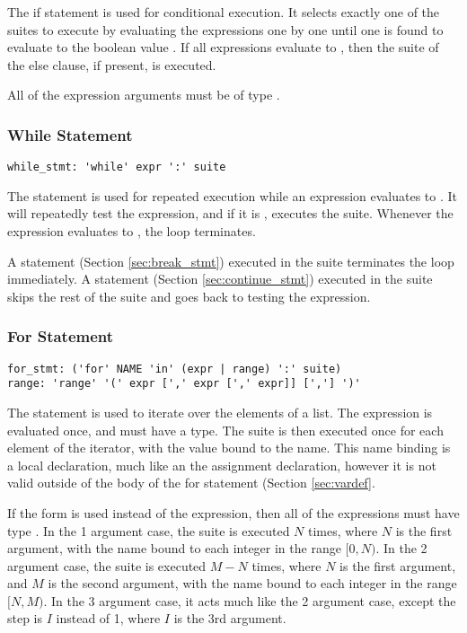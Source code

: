 The if statement is used for conditional execution. It selects exactly one of
the suites to execute by evaluating the expressions one by one until one is
found to evaluate to the boolean value . If all expressions evaluate
to , then the suite of the else clause, if present, is executed.

All of the expression arguments must be of type .

\subsubsection{While Statement}
\label{sec:whilestmt}
\begin{lstlisting}
while_stmt: 'while' expr ':' suite
\end{lstlisting}

The  statement is used for repeated execution while an expression evaluates
to . It will repeatedly test the expression, and if it is
, executes the suite. Whenever the expression evaluates to
, the loop terminates.

A  statement (Section \ref{sec:break_stmt}) executed in the suite
terminates the loop immediately. A  statement (Section
\ref{sec:continue_stmt}) executed in the suite skips the rest of the suite and
goes back to testing the expression.


\subsubsection{For Statement}
\label{sec:forstmt}
\begin{lstlisting}
for_stmt: ('for' NAME 'in' (expr | range) ':' suite)
range: 'range' '(' expr [',' expr [',' expr]] [','] ')'
\end{lstlisting}

The  statement is used to iterate over the elements of a list. The
expression is evaluated once, and must have a \code{[T]} type. The suite is then
executed once for each element of the iterator, with the value bound to the
name. This name binding is a local declaration, much like an the assignment
declaration, however it is not valid outside of the body of the for statement
(Section \ref{sec:vardef}.

If the  form is used instead of the expression, then all of the
expressions must have type . In the 1 argument case, the suite is
executed $N$ times, where $N$ is the first argument, with the name bound to each
integer in the range $[0, N)$. In the 2 argument case, the suite is executed
$M-N$ times, where $N$ is the first argument, and $M$ is the second argument,
with the name bound to each integer in the range $[N, M)$. In the 3 argument
case, it acts much like the 2 argument case, except the step is $I$ instead of
1, where $I$ is the 3rd argument.

